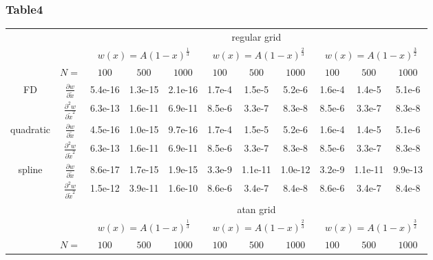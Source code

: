 \subsubsection{Table4}
\begin{tabular}{cc|c|c|c|c|c|c|c|c|c|}
\cline{3-11}
& & \multicolumn{9}{|c|}{regular grid}
\\ \cline{3-11}
& & \multicolumn{3}{|c|}{$w(x)=A(1-x)^\frac{1}{3}$} &  \multicolumn{3}{|c|}{$w(x)=A(1-x)^\frac{2}{3}$} &  \multicolumn{3}{|c|}{$w(x)=A(1-x)^\frac{3}{2}$}
\\ \cline{2-11}
& \multicolumn{1}{|c|}{$N=$} & $100$ & $500$ & $1000$ & $100$ & $500$ & $1000$ & $100$ & $500$ & $1000$
\\ \cline{1-11}
\multicolumn{1}{|c|}{\multirow{2}{*}{FD}} &
\multicolumn{1}{|c|}{$\frac{\partial w}{\partial \tilde x}$}
  &5.4e-16  &1.3e-15  &2.1e-16  &1.7e-4  &1.5e-5  &5.2e-6  &1.6e-4  &1.4e-5  &5.1e-6
\\ \cline{2-11}
\multicolumn{1}{|c|}{}                        &
\multicolumn{1}{|c|}{$\frac{\partial^2 w}{\partial \tilde x^2}$}
  &6.3e-13  &1.6e-11  &6.9e-11  &8.5e-6  &3.3e-7  &8.3e-8  &8.5e-6  &3.3e-7  &8.3e-8
\\ \cline{1-11}
\multicolumn{1}{|c|}{\multirow{2}{*}{quadratic}} &
\multicolumn{1}{|c|}{$\frac{\partial w}{\partial \tilde x}$}
  &4.5e-16  &1.0e-15  &9.7e-16  &1.7e-4  &1.5e-5  &5.2e-6  &1.6e-4  &1.4e-5  &5.1e-6
\\ \cline{2-11}
\multicolumn{1}{|c|}{}                        &
\multicolumn{1}{|c|}{$\frac{\partial^2 w}{\partial \tilde x^2}$}
  &6.3e-13  &1.6e-11  &6.9e-11  &8.5e-6  &3.3e-7  &8.3e-8  &8.5e-6  &3.3e-7  &8.3e-8
\\ \cline{1-11}
\multicolumn{1}{|c|}{\multirow{2}{*}{spline}} &
\multicolumn{1}{|c|}{$\frac{\partial w}{\partial \tilde x}$}
  &8.6e-17  &1.7e-15  &1.9e-15  &3.3e-9  &1.1e-11  &1.0e-12  &3.2e-9  &1.1e-11  &9.9e-13
\\ \cline{2-11}
\multicolumn{1}{|c|}{}                        &
\multicolumn{1}{|c|}{$\frac{\partial^2 w}{\partial \tilde x^2}$}
  &1.5e-12  &3.9e-11  &1.6e-10  &8.6e-6  &3.4e-7  &8.4e-8  &8.6e-6  &3.4e-7  &8.4e-8
\\ \cline{1-11}
& & \multicolumn{9}{|c|}{atan grid}
\\ \cline{3-11}
& & \multicolumn{3}{|c|}{$w(x)=A(1-x)^\frac{1}{3}$} &  \multicolumn{3}{|c|}{$w(x)=A(1-x)^\frac{2}{3}$} &  \multicolumn{3}{|c|}{$w(x)=A(1-x)^\frac{3}{2}$}
\\ \cline{2-11}
& \multicolumn{1}{|c|}{$N=$} & $100$ & $500$ & $1000$ & $100$ & $500$ & $1000$ & $100$ & $500$ & $1000$

\end{tabular}
